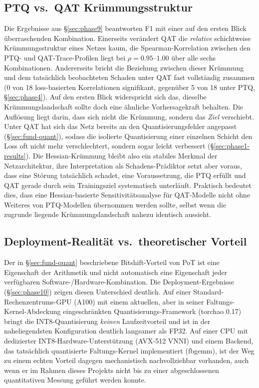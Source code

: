 \subsection{PTQ vs.\ QAT Krümmungsstruktur}
\label{sec:disc-ptqqat}

Die Ergebnisse aus \S\ref{sec:phase9} beantworten F1 mit einer auf den ersten Blick überraschenden Kombination. Einerseits verändert QAT die \emph{relative} schichtweise Krümmungsstruktur eines Netzes kaum, die Spearman-Korrelation zwischen den PTQ- und QAT-Trace-Profilen liegt bei $\rho=0.95$--$1.00$ über alle sechs Kombinationen. Andererseits bricht die Beziehung zwischen dieser Krümmung und dem tatsächlich beobachteten Schaden unter QAT fast vollständig zusammen (0 von 18 loss-basierten Korrelationen signifikant, gegenüber 5 von 18 unter PTQ, \S\ref{sec:phase4}). Auf den ersten Blick widerspricht sich das, dieselbe Krümmungslandschaft sollte doch eine ähnliche Vorhersagekraft behalten. Die Auflösung liegt darin, dass sich nicht die Krümmung, sondern das \emph{Ziel} verschiebt. Unter QAT hat sich das Netz bereits an den Quantisierungsfehler angepasst (\S\ref{sec:fund-quant}), sodass die isolierte Quantisierung einer einzelnen Schicht den Loss oft nicht mehr verschlechtert, sondern sogar leicht verbessert (\S\ref{sec:phase1-results}). Die Hessian-Krümmung bleibt also ein stabiles Merkmal der Netzarchitektur, ihre Interpretation als Schadens-Prädiktor setzt aber voraus, dass eine Störung tatsächlich schadet, eine Voraussetzung, die PTQ erfüllt und QAT gerade durch sein Trainingsziel systematisch unterläuft. Praktisch bedeutet dies, dass eine Hessian-basierte Sensitivitätsanalyse für QAT-Modelle nicht ohne Weiteres von PTQ-Modellen übernommen werden sollte, selbst wenn die zugrunde liegende Krümmungslandschaft nahezu identisch aussieht.

\subsection{Deployment-Realität vs.\ theoretischer Vorteil}
\label{sec:disc-deployment}

Der in \S\ref{sec:fund-quant} beschriebene Bitshift-Vorteil von PoT ist eine Eigenschaft der Arithmetik und nicht automatisch eine Eigenschaft jeder verfügbaren Software-/Hardware-Kombination. Die Deployment-Ergebnisse (\S\ref{sec:phase10}) zeigen diesen Unterschied deutlich. Auf einer Standard-Rechenzentrums-GPU (A100) mit einem aktuellen, aber in seiner Faltungs-Kernel-Abdeckung eingeschränkten Quantisierungs-Framework (torchao 0.17) bringt die INT8-Quantisierung \emph{keinen} Laufzeitvorteil und ist in der naheliegendsten Konfiguration deutlich langsamer als FP32. Auf einer CPU mit dedizierter INT8-Hardware-Unterstützung (AVX-512 VNNI) und einem Backend, das tatsächlich quantisierte Faltungs-Kernel implementiert (fbgemm), ist der Weg zu einem echten Vorteil dagegen mechanistisch nachvollziehbar vorhanden, auch wenn er im Rahmen dieses Projekts nicht bis zu einer abgeschlossenen quantitativen Messung geführt werden konnte.
\par\medskip

